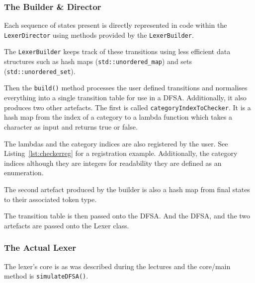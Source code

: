 \documentclass[article]{uom-coursework}
\newcommand{\listref}[1]{Listing~\ref{lst:#1}}
\begin{document}
\subsubsection{The Builder \& Director}

Each sequence of states present is directly
represented in code within the
\texttt{LexerDirector} using methods provided by
the \texttt{LexerBuilder}.



The \texttt{LexerBuilder} keeps track of these
transitions using less efficient data structures
such as hash maps (\texttt{std::unordered\_map})
and sets (\texttt{std::unordered\_set}).

Then the \texttt{build()} method processes the
user defined transitions and normalises everything
into a single transition table for use in a DFSA.
Additionally, it also produces two other
artefacts. The first is called
\texttt{categoryIndexToChecker}. It is a hash map
from the index of a category to a lambda function
which takes a character as input and returns true
or false.

The lambdas and the category indices are also
registered by the user. See \listref{checkerreg}
for a registration example. Additionally, the
category indices although they are integers for
readability they are defined as an enumeration.



The second artefact produced by the builder is
also a hash map from final states to their
associated token type.

The transition table is then passed onto the DFSA.
And the DFSA, and the two artefacts are passed
onto the Lexer class.



\subsubsection{The Actual Lexer}

The lexer's core is as was described during the
lectures and the core/main method is
\texttt{simulateDFSA()}.
\end{document}
